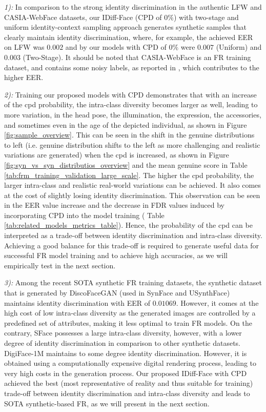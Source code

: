 \documentclass[10pt,twocolumn,letterpaper]{article}
\newcommand{\approachname}{IDiff-Face }
\begin{document}
\textit{1):} In comparison to the strong identity discrimination in the authentic LFW and CASIA-WebFace datasets, our \approachname (CPD of $0\%$) with two-stage and uniform identity-context sampling approach generates synthetic samples that clearly maintain identity discrimination, where, for example, the achieved EER on LFW was $0.002$ and by our models with CPD of $0\%$ were $0.007$ (Uniform) and $0.003$ (Two-Stage). It should be noted that CASIA-WebFace is an FR training dataset, and contains some noisy labels, as reported in \cite{DBLP:conf/iccv/WangWSWM19}, which contributes to the higher EER.  


\textit{2):} Training our proposed models with CPD demonstrates that with an increase of the \acrshort{cpd} probability, the intra-class diversity becomes larger as well, leading to more variation, in the head pose, the illumination, the expression, the accessories, and sometimes even in the age of the depicted individual, as shown in Figure \ref{fig:sample_overview}. This can be seen in the shift in the genuine distributions to left (i.e. genuine distribution shifts to the left as more challenging and realistic variations are generated) when the \acrshort{cpd} is increased, as shown in Figure \ref{fig:syn_vs_syn_distributios_overview} and the mean genuine score in Table \ref{tab:frm_training_validation_large_scale}. The higher the \acrshort{cpd} probability, the larger intra-class and realistic real-world variations can be achieved. It also comes at the cost of slightly losing identity discrimination. This observation can be seen in the EER value increase and the decrease in FDR values induced by incorporating CPD into the model training ( Table \ref{tab:related_models_metrics_table}). Hence, the probability of the \acrshort{cpd} can be interpreted as a trade-off between identity discrimination and intra-class diversity. Achieving a good balance for this trade-off is required to generate useful data for successful FR model training and to achieve high accuracies, as we will empirically test in the next section. 


\textit{3):} Among the recent SOTA synthetic FR training datasets, the synthetic dataset that is generated by DiscoFaceGAN \cite{Deng2020} (used in SynFace and USynthFace) maintains identity discrimination with EER of $0.01069$. However, it comes at the high cost of low intra-class diversity as the generated images are controlled by a predefined set of attributes, making it less optimal to train FR models. On the contrary, SFace possesses a large intra-class diversity, however, with a lower degree of identity discrimination in comparison to other synthetic datasets. DigiFace-1M maintains to some degree identity discrimination. However, it is obtained using a computationally expensive digital rendering process, leading to very high costs in the generation process. Our proposed \approachname with CPD achieved the best (most representative of reality and thus suitable for training) trade-off between identity discrimination and intra-class diversity and leads to SOTA synthetic-based FR, as we will present in the next section.
\end{document}
